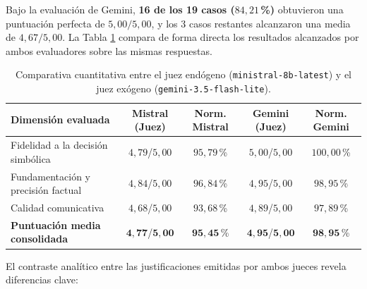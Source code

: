 \documentclass[12pt,a4paper]{report}
\begin{document}
Bajo la evaluación de Gemini, \textbf{16 de los 19 casos ($84{,}21\,$\%)} obtuvieron una puntuación perfecta de $5{,}00/5{,}00$, y los 3 casos restantes alcanzaron una media de $4{,}67/5{,}00$. La Tabla \ref{tab:nlg_comparison} compara de forma directa los resultados alcanzados por ambos evaluadores sobre las mismas respuestas.

\begin{table}[H]
\centering
\footnotesize
\setlength{\tabcolsep}{4pt}
\label{tab:nlg_comparison}
\begin{tabularx}{\textwidth}{@{}>{\raggedright\arraybackslash}X c c c c@{}}
\toprule
\textbf{Dimensión evaluada} & \textbf{Mistral (Juez)} & \textbf{Norm. Mistral} & \textbf{Gemini (Juez)} & \textbf{Norm. Gemini} \\
\midrule
Fidelidad a la decisión simbólica & $4{,}79$/$5{,}00$ & $95{,}79\,$\% & $5{,}00$/$5{,}00$ & $100{,}00\,$\% \\
Fundamentación y precisión factual & $4{,}84$/$5{,}00$ & $96{,}84\,$\% & $4{,}95$/$5{,}00$ & $98{,}95\,$\% \\
Calidad comunicativa & $4{,}68$/$5{,}00$ & $93{,}68\,$\% & $4{,}89$/$5{,}00$ & $97{,}89\,$\% \\
\midrule
\textbf{Puntuación media consolidada} & $\mathbf{4{,}77}$/$\mathbf{5{,}00}$ & $\mathbf{95{,}45\,}$\% & $\mathbf{4{,}95}$/$\mathbf{5{,}00}$ & $\mathbf{98{,}95\,}$\% \\
\bottomrule
\end{tabularx}
\caption{Comparativa cuantitativa entre el juez endógeno (\texttt{ministral-8b-latest}) y el juez exógeno (\texttt{gemini-3.5-flash-lite}).}
\end{table}

El contraste analítico entre las justificaciones emitidas por ambos jueces revela diferencias clave:
\end{document}
